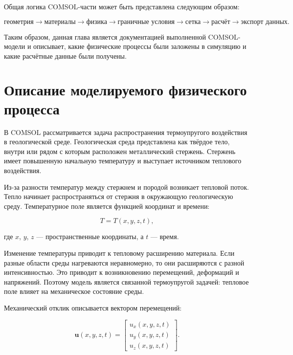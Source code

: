 Общая логика COMSOL-части может быть представлена следующим образом:

\begin{equation}
\text{геометрия} \rightarrow \text{материалы} \rightarrow \text{физика} \rightarrow \text{граничные условия} \rightarrow \text{сетка} \rightarrow \text{расчёт} \rightarrow \text{экспорт данных}.
\end{equation}

Таким образом, данная глава является документацией выполненной COMSOL-модели и описывает, какие физические процессы были заложены в симуляцию и какие расчётные данные были получены.

\section{Описание моделируемого физического процесса}

В COMSOL рассматривается задача распространения термоупругого воздействия в геологической среде. Геологическая среда представлена как твёрдое тело, внутри или рядом с которым расположен металлический стержень. Стержень имеет повышенную начальную температуру и выступает источником теплового воздействия.

Из-за разности температур между стержнем и породой возникает тепловой поток. Тепло начинает распространяться от стержня в окружающую геологическую среду. Температурное поле является функцией координат и времени:

\begin{equation}
T = T(x,y,z,t),
\end{equation}

где $x$, $y$, $z$ --- пространственные координаты, а $t$ --- время.

Изменение температуры приводит к тепловому расширению материала. Если разные области среды нагреваются неравномерно, то они расширяются с разной интенсивностью. Это приводит к возникновению перемещений, деформаций и напряжений. Поэтому модель является связанной термоупругой задачей: тепловое поле влияет на механическое состояние среды.

Механический отклик описывается вектором перемещений:

\begin{equation}
\mathbf{u}(x,y,z,t)=
\begin{bmatrix}
u_x(x,y,z,t)\\
u_y(x,y,z,t)\\
u_z(x,y,z,t)
\end{bmatrix}.
\end{equation}

